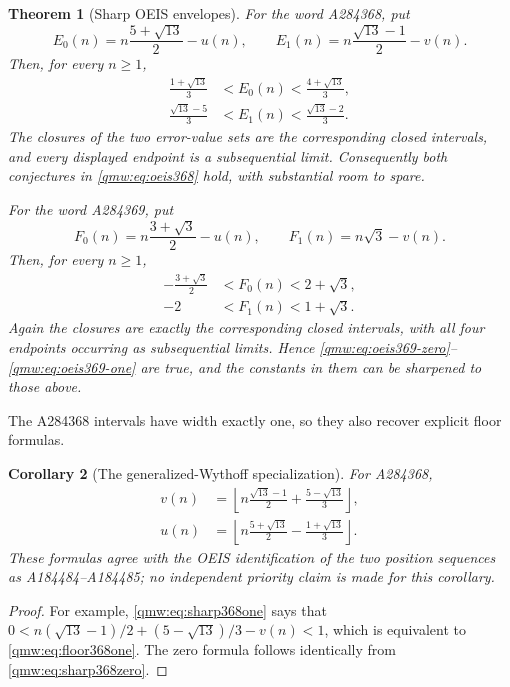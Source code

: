 \documentclass[11pt]{article}
\numberwithin{equation}{section}
\newtheorem{theorem}{Theorem}[section]
\newtheorem{corollary}[theorem]{Corollary}
\theoremstyle{definition}
\theoremstyle{remark}
\begin{document}
\begin{theorem}[Sharp OEIS envelopes]\label{qmw:thm:oeis-main}
For the word A284368, put
\[
 E_0(n)=n\frac{5+\sqrt{13}}2-u(n),\qquad
 E_1(n)=n\frac{\sqrt{13}-1}{2}-v(n).
\]
Then, for every $n\geq1$,
\begin{align}
\frac{1+\sqrt{13}}3&<E_0(n)<\frac{4+\sqrt{13}}3,
\label{qmw:eq:sharp368zero}\\
\frac{\sqrt{13}-5}{3}&<E_1(n)<\frac{\sqrt{13}-2}{3}.
\label{qmw:eq:sharp368one}
\end{align}
The closures of the two error-value sets are the corresponding closed
intervals, and every displayed endpoint is a subsequential limit.
Consequently both conjectures in \eqref{qmw:eq:oeis368} hold, with substantial
room to spare.

For the word A284369, put
\[
 F_0(n)=n\frac{3+\sqrt3}{2}-u(n),\qquad
 F_1(n)=n\sqrt3-v(n).
\]
Then, for every $n\geq1$,
\begin{align}
-\frac{3+\sqrt3}{2}&<F_0(n)<2+\sqrt3,
\label{qmw:eq:sharp369zero}\\
-2&<F_1(n)<1+\sqrt3.
\label{qmw:eq:sharp369one}
\end{align}
Again the closures are exactly the corresponding closed intervals, with all
four endpoints occurring as subsequential limits.  Hence
\eqref{qmw:eq:oeis369-zero}--\eqref{qmw:eq:oeis369-one} are true, and the constants
in them can be sharpened to those above.
\end{theorem}

The A284368 intervals have width exactly one, so they also recover explicit
floor formulas.

\begin{corollary}[The generalized-Wythoff specialization]\label{qmw:cor:beatty368}
For A284368,
\begin{align}
v(n)&=\left\lfloor
 n\frac{\sqrt{13}-1}{2}+\frac{5-\sqrt{13}}3
\right\rfloor,\label{qmw:eq:floor368one}\\
u(n)&=\left\lfloor
 n\frac{5+\sqrt{13}}2-\frac{1+\sqrt{13}}3
\right\rfloor.\label{qmw:eq:floor368zero}
\end{align}
These formulas agree with the OEIS identification of the two position
sequences as A184484--A184485; no independent priority claim is made for
this corollary.
\end{corollary}

\begin{proof}
For example, \eqref{qmw:eq:sharp368one} says that
$0<n(\sqrt{13}-1)/2+(5-\sqrt{13})/3-v(n)<1$, which is equivalent to
\eqref{qmw:eq:floor368one}.  The zero formula follows identically from
\eqref{qmw:eq:sharp368zero}.
\end{proof}
\end{document}
